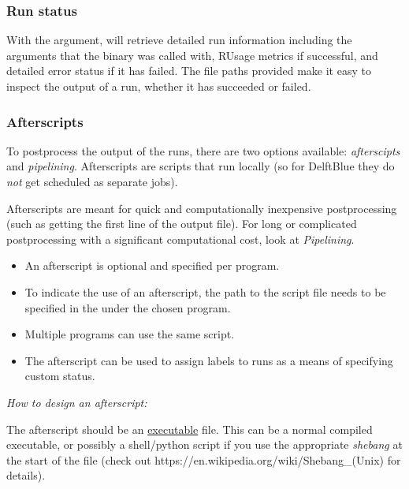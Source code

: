 \documentclass[a4paper,english]{article}
\begin{document}
\begin{adjustwidth}{18pt}{0pt}
            \subsubsection{Run status}
                With the  argument,   will retrieve detailed
                run information including the arguments that the binary was called with, RUsage metrics
                if successful, and detailed error status if it has failed.
                The file paths provided make it easy to inspect the output of a run, whether it has
                succeeded or failed.

            \subsubsection{Afterscripts}
                To postprocess the output of the runs, there are two options available: \emph{afterscipts} and \emph{pipelining}.
                Afterscripts are scripts that run locally (so for DelftBlue they do
                \emph{not} get scheduled as separate jobs).

                Afterscripts are meant for quick and computationally inexpensive postprocessing 
                (such as getting the first line of the output file).
                For long or complicated postprocessing with a significant computational cost, look at \emph{Pipelining}.

                \begin{itemize}
                    \item An afterscript is optional and specified per program. 
                    \item To indicate the use of an afterscript, the path to the script file needs to be specified in the  under the chosen program.
                    \item Multiple programs can use the same script. 
                    \item The afterscript can be used to assign labels to runs as a means of specifying custom status.
                \end{itemize}

                \emph{How to design an afterscript:}

                The afterscript should be an \underline{executable} file. This can be a normal compiled executable, or possibly a shell/python script if you use the appropriate \emph{shebang} at the start of the file (check out https://en.wikipedia.org/wiki/Shebang\_(Unix) for details).


\end{adjustwidth}
\end{document}
